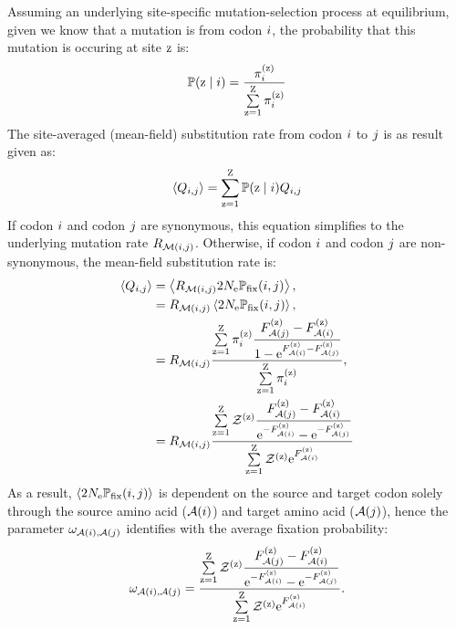 \documentclass{article}
\begin{document}
Assuming an underlying site-specific mutation-selection process at equilibrium, given we know that a mutation is from codon ${i}$, the probability that this mutation is occuring at site $\text{z}$ is:
\begin{align}
    \mathbb{P} (\text{z} \mid {i}) = \dfrac{ \pi_{{i}}^{(\text{z})} }{\sum\limits_{\text{z}=1}^{\text{Z}} \pi_{{i}}^{(\text{z})} }
\end{align}
The site-averaged (mean-field) {substitution} rate from codon ${i}$ to ${j}$ is as result given as:
\begin{align}
    \left\langle Q_{{i}, {j}} \right\rangle = \sum\limits_{\text{z}=1}^{\text{Z}} \mathbb{P} (\text{z} \mid {i}) Q_{{i}, {j}}
\end{align}
If codon ${i}$ and codon ${j}$ are {synonymous}, this equation simplifies to the underlying mutation rate $R_{\mathcal{M}({i}, {j})}$.
Otherwise, if codon ${i}$ and codon ${j}$ are {non-synonymous}, the mean-field {substitution} rate is:
\begin{align}
    \left\langle Q_{{i}, {j}} \right\rangle & = \left\langle R_{\mathcal{M}({i}, {j})} 2 N_{\text{e}} \mathbb{P}_{\text{fix}} ({i}, {j}) \right\rangle, \\
    & = R_{\mathcal{M}({i}, {j})} \left\langle 2 N_{\text{e}} \mathbb{P}_{\text{fix}} ({i}, {j}) \right\rangle, \\
    & = R_{\mathcal{M}({i}, {j})} \dfrac{ \sum\limits_{\text{z}=1}^{\text{Z}} \pi_{{i}}^{(\text{z})} \dfrac{F_{\mathcal{A}({j})}^{(\text{z})} - F_{\mathcal{A}({i})}^{(\text{z})}}{1 - \text{e}^{F_{\mathcal{A}({i})}^{(\text{z})} - F_{\mathcal{A}({j})}^{(\text{z})}}} }{ \sum\limits_{\text{z}=1}^{\text{Z}} \pi_{{i}}^{(\text{z})} }, \\
    & = R_{\mathcal{M}({i}, {j})} \dfrac{ \sum\limits_{\text{z}=1}^{\text{Z}} \mathcal{Z}^{(\text{z})}  \dfrac{F_{\mathcal{A}({j})}^{(\text{z})} - F_{\mathcal{A}({i})}^{(\text{z})}}{ \text{e}^{-F_{\mathcal{A}({i})}^{(\text{z})}} - \text{e}^{ - F_{\mathcal{A}({j})}^{(\text{z})}}} }{  \sum\limits_{\text{z}=1}^{\text{Z}} \mathcal{Z}^{(\text{z})} \text{e}^{F_{\mathcal{A}({i})}^{(\text{z})}} }
\end{align}
As a result, $\left\langle 2 N_{\text{e}} \mathbb{P}_{\text{fix}} ({i}, {j}) \right\rangle$ is dependent on the source and target codon solely through the source amino acid ($\mathcal{A}({i})$) and target amino acid ($\mathcal{A}({j})$), hence the parameter $\omega_{\mathcal{A}({i}), \mathcal{A}({j})}$ identifies with the average fixation probability:
\begin{equation}
    \label{eq:omega_pairs_predicted} \omega_{\mathcal{A}({i}), \mathcal{A}({j})} = \dfrac{ \sum\limits_{\text{z}=1}^{\text{Z}} \mathcal{Z}^{(\text{z})}  \dfrac{F_{\mathcal{A}({j})}^{(\text{z})} - F_{\mathcal{A}({i})}^{(\text{z})}}{ \text{e}^{-F_{\mathcal{A}({i})}^{(\text{z})}} - \text{e}^{ - F_{\mathcal{A}({j})}^{(\text{z})}}} }{  \sum\limits_{\text{z}=1}^{\text{Z}} \mathcal{Z}^{(\text{z})} \text{e}^{F_{\mathcal{A}({i})}^{(\text{z})}}  }.
\end{equation}
\end{document}
